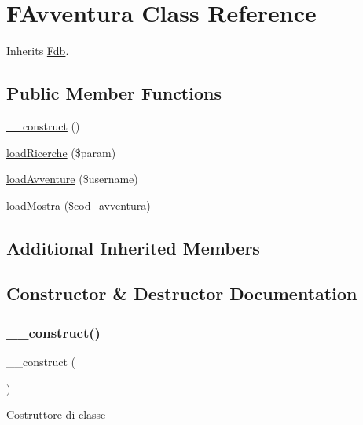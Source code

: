\hypertarget{class_f_avventura}{}\section{F\+Avventura Class Reference}
\label{class_f_avventura}


Inherits \mbox{\hyperlink{class_fdb}{Fdb}}.

\subsection*{Public Member Functions}
\begin{DoxyCompactItemize}
\item 
\mbox{\hyperlink{class_f_avventura_a095c5d389db211932136b53f25f39685}{\+\_\+\+\_\+construct}} ()
\item 
\mbox{\hyperlink{class_f_avventura_ac2694a7dd3ef55896292c94037bad8b7}{load\+Ricerche}} (\$param)
\item 
\mbox{\hyperlink{class_f_avventura_af0d1851adb6a197e257708a29576d5a1}{load\+Avventure}} (\$username)
\item 
\mbox{\hyperlink{class_f_avventura_ac86f7880e6e8e228f0559680fbd165b1}{load\+Mostra}} (\$cod\+\_\+avventura)
\end{DoxyCompactItemize}
\subsection*{Additional Inherited Members}


\subsection{Constructor \& Destructor Documentation}
\mbox{\label{class_f_avventura_a095c5d389db211932136b53f25f39685}} 
\subsubsection{\texorpdfstring{\+\_\+\+\_\+construct()}{\_\_construct()}}
{\footnotesize\ttfamily \+\_\+\+\_\+construct (\begin{DoxyParamCaption}{ }\end{DoxyParamCaption})}

Costruttore di classe 

